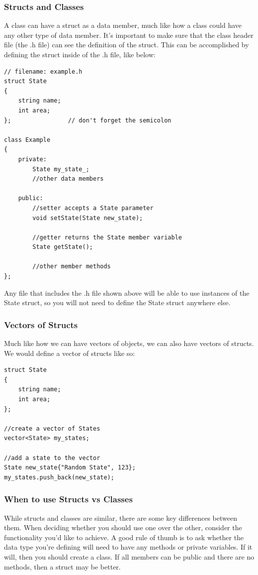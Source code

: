 \subsubsection{Structs and Classes}

A class can have a struct as a data member, much like how a class could have any other type of data member. It's important to make sure that the class header file (the .h file) can see the definition of the struct. This can be accomplished by defining the struct inside of the .h file, like below:

\begin{verbatim}
// filename: example.h
struct State
{
    string name;
    int area;
};                // don't forget the semicolon

class Example
{
    private:
        State my_state_;
        //other data members

    public:
        //setter accepts a State parameter
        void setState(State new_state);

        //getter returns the State member variable
        State getState();

        //other member methods
};
\end{verbatim}

Any file that includes the .h file shown above will be able to use instances of the State struct, so you will not need to define the State struct anywhere else.

\subsubsection{Vectors of Structs}

Much like how we can have vectors of objects, we can also have vectors of structs. We would define a vector of structs like so:

\begin{verbatim}
struct State
{
    string name;
    int area;
};

//create a vector of States
vector<State> my_states;

//add a state to the vector
State new_state{"Random State", 123};
my_states.push_back(new_state);
\end{verbatim}

\subsubsection{When to use Structs vs Classes}
While structs and classes are similar, there are some key differences between them. When deciding whether you should use one over the other, consider the functionality you'd like to achieve. A good rule of thumb is to ask whether the data type you're defining will need to have any methods or private variables. If it will, then you should create a class. If all members can be public and there are no methods, then a struct may be better.

